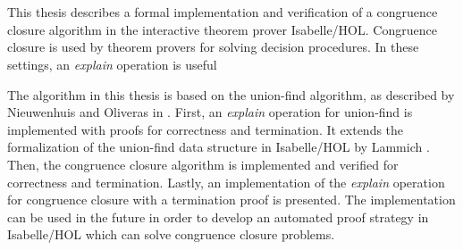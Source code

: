 \chapter{\abstractname}

This thesis describes a formal implementation and verification of a congruence closure algorithm in the interactive theorem prover Isabelle/HOL. Congruence closure is used by theorem provers for solving decision procedures.
In these settings, an \emph{explain} operation is useful

The algorithm in this thesis is based on the union-find algorithm, as described by Nieuwenhuis and Oliveras in \cite{Nieuwenhuis}.
First, an \emph{explain} operation for union-find is implemented with proofs for correctness and termination. It extends the formalization of the union-find data structure in Isabelle/HOL by Lammich \cite{unionfind-isabelle}.
Then, the congruence closure algorithm is implemented and verified for correctness and termination.
Lastly, an implementation of the \emph{explain} operation for congruence closure with a termination proof is presented.
The implementation can be used in the future in order to develop an automated proof strategy in Isabelle/HOL which can solve congruence closure problems.